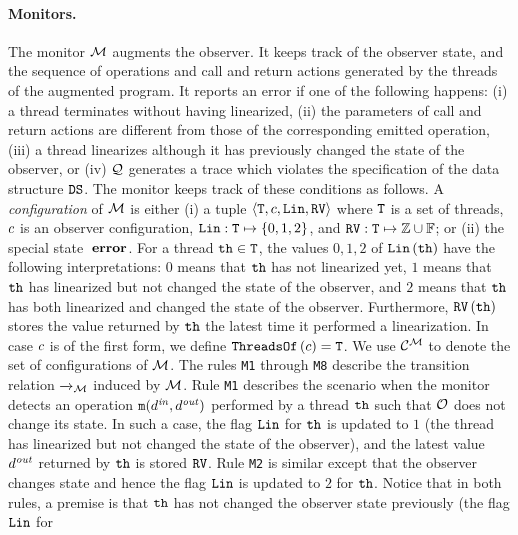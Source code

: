 \paragraph{Monitors.}
%
The monitor ${\mathcal M}$ augments the observer. It keeps track of 
the observer state, and the sequence of operations and
call and return actions generated by the threads of the augmented program.
It reports
an error if one of the following happens:
(i)
a thread terminates without having linearized,
(ii) 
the parameters of call and return actions are different from those of
the corresponding emitted operation,
%
(iii)
a thread linearizes although it has previously changed the state
of the observer, or
%
(iv)
${\mathcal Q}$ generates a trace which violates the specification of the data
structure ${\tt DS}$.
%
The monitor keeps track of these conditions as follows.
%
A {\it configuration} of ${\mathcal M}$ is either
(i) a tuple
$\left\langle{\tt T},c,{\tt Lin},{\tt RV}\right\rangle$
where ${\tt T}$ is a set of threads,
$c$ is an observer configuration,
${\tt Lin}:{\tt T}\mapsto\left\{0,1,2\right\}$, and
${\tt RV}:{\tt T}\mapsto{\mathbb Z}\cup\mathbb{F}$;
or
(ii) the special state $\;{\bf error}$.
%
For a thread ${\tt th}\in{\tt T}$, 
the values $0,1,2$ of 
${\tt Lin}\left({\tt th}\right)$ have the following interpretations:
$0$ means that ${\tt th}$ has not linearized yet,
$1$ means that ${\tt th}$ has linearized but not changed the state of the observer,
and
$2$ means that ${\tt th}$ has both linearized and changed 
the state of the observer.
%
Furthermore, 
${\tt RV}\left({\tt th}\right)$ stores the value returned by ${\tt th}$ the latest
time it performed a linearization.
%
In case $c$ is of the first form,
we define ${\tt ThreadsOf}\left(c\right)={\tt T}$.
%
We use ${\mathcal C}^{{\mathcal M}}$ to denote the set of configurations
of ${\mathcal M}$.
%
The rules
{\tt M1} through {\tt M8}
describe the transition relation
${\xrightarrow{}{}}_{\!\!{\mathcal M}}$ induced by ${\mathcal M}$. 
%
Rule {\tt M1} describes the scenario when the monitor 
detects an operation ${\tt m}(d^{\it in},d^{\it out})$ performed by 
a thread ${\tt th}$ such that ${\mathcal O}$ does not change its state.
%
In such a case, the flag ${\tt Lin}$ for ${\tt th}$
is updated to $1$ (the thread has linearized but not changed the state
of the observer), and the latest value $d^{\it out}$
returned by ${\tt th}$ is stored ${\tt RV}$.
%
Rule {\tt M2} is similar except that the observer changes state
and hence the flag ${\tt Lin}$ is updated to $2$ for ${\tt th}$.
%
Notice that in both rules, a premise is that ${\tt th}$ has not
changed the observer state previously (the flag ${\tt Lin}$ for
